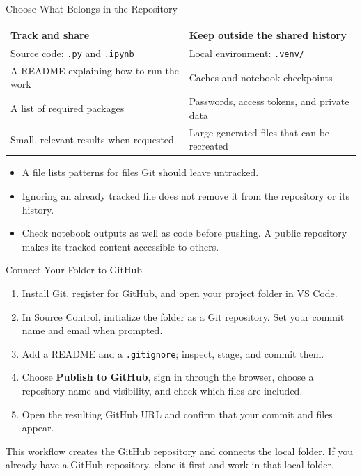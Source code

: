 \begin{frame}{Choose What Belongs in the Repository}
\small
\begin{tabularx}{\linewidth}{@{}YY@{}}
\toprule\textbf{Track and share} & \textbf{Keep outside the shared history}\\\midrule
Source code: \texttt{.py} and \texttt{.ipynb} & Local environment: \texttt{.venv/}\\
A README explaining how to run the work & Caches and notebook checkpoints\\
A list of required packages & Passwords, access tokens, and private data\\
Small, relevant results when requested & Large generated files that can be recreated\\\bottomrule
\end{tabularx}
\par\medskip
\begin{itemize}
\item A  file lists patterns for files Git should leave untracked.
\item Ignoring an already tracked file does not remove it from the repository or its history.
\item Check notebook outputs as well as code before pushing. A public repository makes its tracked content accessible to others.
\end{itemize}
\end{frame}

\begin{frame}{Connect Your Folder to GitHub}
\small
\begin{enumerate}
\item Install Git, register for GitHub, and open your project folder in VS Code.
\item In Source Control, initialize the folder as a Git repository. Set your commit name and email when prompted.
\item Add a README and a \texttt{.gitignore}; inspect, stage, and commit them.
\item Choose \textbf{Publish to GitHub}, sign in through the browser, choose a repository name and visibility, and check which files are included.
\item Open the resulting GitHub URL and confirm that your commit and files appear.
\end{enumerate}
\medskip
This workflow creates the GitHub repository and connects the local folder. If you already have a GitHub repository, clone it first and work in that local folder.
\end{frame}


